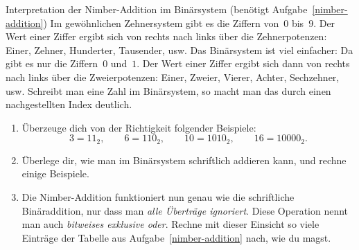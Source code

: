 \documentclass{zirkelblatt}
\begin{document}
\begin{aufgabe}{Interpretation der Nimber-Addition im Binärsystem
(benötigt Aufgabe~\ref{nimber-addition})}
\label{nimber-addition-binaer}
Im gewöhnlichen Zehnersystem gibt es die Ziffern von~$0$ bis~$9$. Der Wert
einer Ziffer ergibt sich von rechts nach links über die Zehnerpotenzen: Einer,
Zehner, Hunderter, Tausender, usw. Das Binärsystem ist viel einfacher: Da gibt
es nur die Ziffern~$0$ und~$1$. Der Wert einer Ziffer ergibt sich dann von
rechts nach links über die Zweierpotenzen: Einer, Zweier, Vierer, Achter,
Sechzehner, usw. Schreibt man eine Zahl im Binärsystem, so macht man das durch
einen nachgestellten Index deutlich.
\begin{enumerate}
\item Überzeuge dich von der Richtigkeit folgender Beispiele:
\[ 3 = 11_2, \qquad
  6 = 110_2, \qquad
  10 = 1010_2, \qquad
  16 = 10000_2. \]
\item Überlege dir, wie man im Binärsystem schriftlich addieren kann, und
rechne einige Beispiele.
\item Die Nimber-Addition funktioniert nun genau wie die schriftliche
Binäraddition, nur dass man \emph{alle Überträge ignoriert}. Diese Operation
nennt man auch \emph{bitweises exklusive oder}. Rechne mit dieser
Einsicht so viele Einträge der Tabelle aus Aufgabe~\ref{nimber-addition} nach,
wie du magst.
\end{enumerate}
\end{aufgabe}
\end{document}
